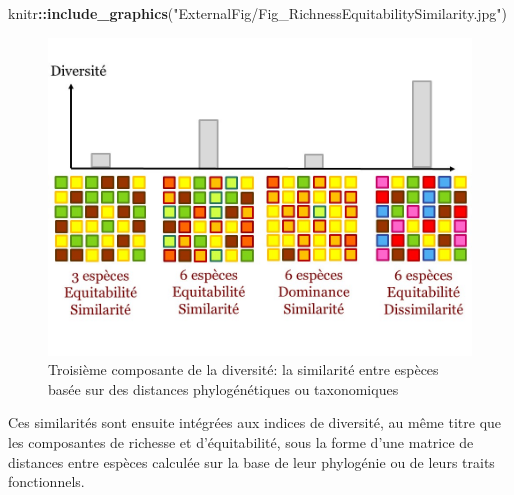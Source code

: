 \documentclass[
  11pt,
  french,
  A4paper,
  extrafontsizes,onecolumn,openright
  ]{memoir}
\newenvironment{Shaded}{\begin{snugshade}}{\end{snugshade}}
\newcommand{\KeywordTok}[1]{\textcolor[rgb]{0.13,0.29,0.53}{\textbf{#1}}}
\newcommand{\StringTok}[1]{\textcolor[rgb]{0.31,0.60,0.02}{#1}}
\newcommand{\OperatorTok}[1]{\textcolor[rgb]{0.81,0.36,0.00}{\textbf{#1}}}
\newcommand{\NormalTok}[1]{#1}
\begin{document}
\begin{Shaded}
\begin{Highlighting}[]
\NormalTok{knitr}\OperatorTok{::}\KeywordTok{include_graphics}\NormalTok{(}\StringTok{"ExternalFig/Fig_RichnessEquitabilitySimilarity.jpg"}\NormalTok{)}
\end{Highlighting}
\end{Shaded}

\begin{figure}

{\centering \includegraphics[width=0.6\linewidth]{ExternalFig/Fig_RichnessEquitabilitySimilarity} 

}

\caption{Troisième composante de la diversité: la similarité entre espèces basée sur des distances phylogénétiques ou taxonomiques}\label{fig:RichEquSim}
\end{figure}

Ces similarités sont ensuite intégrées aux indices de diversité, au même
titre que les composantes de richesse et d'équitabilité, sous la forme
d'une matrice de distances entre espèces calculée sur la base de leur
phylogénie ou de leurs traits fonctionnels.
\end{document}
